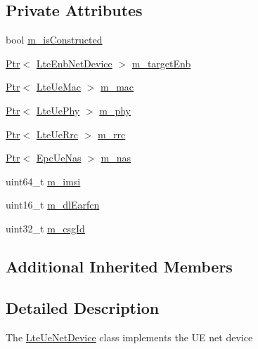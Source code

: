 \subsection*{Private Attributes}
\begin{DoxyCompactItemize}
\item 
bool \hyperlink{classns3_1_1LteUeNetDevice_ae4707ad062ad0b20f5b0d5380add63c7}{m\+\_\+is\+Constructed}
\item 
\hyperlink{classns3_1_1Ptr}{Ptr}$<$ \hyperlink{classns3_1_1LteEnbNetDevice}{Lte\+Enb\+Net\+Device} $>$ \hyperlink{classns3_1_1LteUeNetDevice_adeb036e1f1ab5f186930dbef62edadf8}{m\+\_\+target\+Enb}
\item 
\hyperlink{classns3_1_1Ptr}{Ptr}$<$ \hyperlink{classns3_1_1LteUeMac}{Lte\+Ue\+Mac} $>$ \hyperlink{classns3_1_1LteUeNetDevice_a5561b995d1cd375051f4d3215572bab1}{m\+\_\+mac}
\item 
\hyperlink{classns3_1_1Ptr}{Ptr}$<$ \hyperlink{classns3_1_1LteUePhy}{Lte\+Ue\+Phy} $>$ \hyperlink{classns3_1_1LteUeNetDevice_a87f71c630d166519bf1b712de30f5f77}{m\+\_\+phy}
\item 
\hyperlink{classns3_1_1Ptr}{Ptr}$<$ \hyperlink{classns3_1_1LteUeRrc}{Lte\+Ue\+Rrc} $>$ \hyperlink{classns3_1_1LteUeNetDevice_a180bf4a8613e55bd2863045f607703dd}{m\+\_\+rrc}
\item 
\hyperlink{classns3_1_1Ptr}{Ptr}$<$ \hyperlink{classns3_1_1EpcUeNas}{Epc\+Ue\+Nas} $>$ \hyperlink{classns3_1_1LteUeNetDevice_ab48155d7243e9591a027ce6f6294587f}{m\+\_\+nas}
\item 
uint64\+\_\+t \hyperlink{classns3_1_1LteUeNetDevice_a27e4a8e6e090100b71acb158e5320ee5}{m\+\_\+imsi}
\item 
uint16\+\_\+t \hyperlink{classns3_1_1LteUeNetDevice_a8e1454295e305c54353a6642cca08f78}{m\+\_\+dl\+Earfcn}
\item 
uint32\+\_\+t \hyperlink{classns3_1_1LteUeNetDevice_a0f88d0d0c4d39038bbbf6cbe0b181b30}{m\+\_\+csg\+Id}
\end{DoxyCompactItemize}
\subsection*{Additional Inherited Members}


\subsection{Detailed Description}
The \hyperlink{classns3_1_1LteUeNetDevice}{Lte\+Ue\+Net\+Device} class implements the UE net device 

